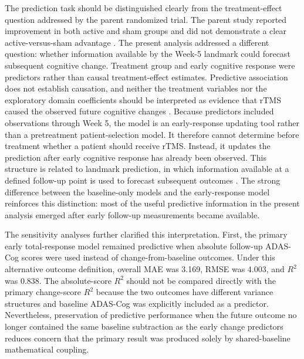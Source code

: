\documentclass[11pt]{article}
\begin{document}
The prediction task should be distinguished clearly from the treatment-effect question addressed by the parent randomized trial. The parent study reported improvement in both active and sham groups and did not demonstrate a clear active-versus-sham advantage \citep{moussavi2024trial}. The present analysis addressed a different question: whether information available by the Week-5 landmark could forecast subsequent cognitive change. Treatment group and early cognitive response were predictors rather than causal treatment-effect estimates. Predictive association does not establish causation, and neither the treatment variables nor the exploratory domain coefficients should be interpreted as evidence that rTMS caused the observed future cognitive changes \citep{shmueli2010explain}. Because predictors included observations through Week 5, the model is an early-response updating tool rather than a pretreatment patient-selection model. It therefore cannot determine before treatment whether a patient should receive rTMS. Instead, it updates the prediction after early cognitive response has already been observed. This structure is related to landmark prediction, in which information available at a defined follow-up point is used to forecast subsequent outcomes \citep{vanhouwelingen2007landmark}. The strong difference between the baseline-only models and the early-response model reinforces this distinction: most of the useful predictive information in the present analysis emerged after early follow-up measurements became available.

The sensitivity analyses further clarified this interpretation. First, the primary early total-response model remained predictive when absolute follow-up ADAS-Cog scores were used instead of change-from-baseline outcomes. Under this alternative outcome definition, overall MAE was 3.169, RMSE was 4.003, and $R^2$ was 0.838. The absolute-score $R^2$ should not be compared directly with the primary change-score $R^2$ because the two outcomes have different variance structures and baseline ADAS-Cog was explicitly included as a predictor. Nevertheless, preservation of predictive performance when the future outcome no longer contained the same baseline subtraction as the early change predictors reduces concern that the primary result was produced solely by shared-baseline mathematical coupling.
\end{document}
